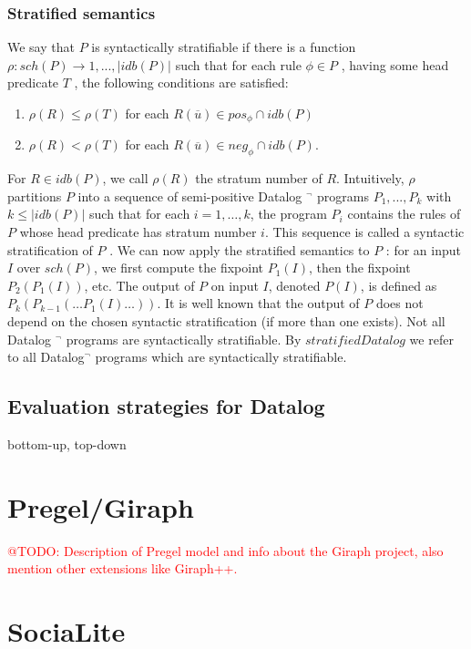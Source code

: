 \documentclass{pracamgr}
\makeatletter
\theoremstyle{plain}
\theoremstyle{definition}
\theoremstyle{remark}
\newcommand{\todo}[1]{\textcolor{red}{@TODO: #1}}
\makeatother
\begin{document}
\subsection{Stratified semantics} We say that $P$ is syntactically stratifiable if there is a function $\rho : sch(P ) \to {1, . . . , |idb(P )|}$
such that for each rule $\phi \in P$ , having some head predicate
$T$ , the following conditions are satisfied: 

\begin{enumerate}
\item $\rho(R) \le \rho(T )$ for each $R(\overline{u}) \in pos_\phi \cap idb(P)$
\item $\rho(R) < \rho(T )$ for each $R(\overline{u}) \in neg_\phi \cap idb(P )$.
\end{enumerate}
 For $R \in idb(P )$, we call $\rho(R)$ the stratum number of $R$. Intuitively, $\rho$ partitions $P$ into
a sequence of semi-positive Datalog $^\neg$ programs $P_1 , . . . , P_k$
with $k \le |idb(P )|$ such that for each $i = 1, \dots , k$, the program $P_i$ contains the rules of $P$ whose head predicate has
stratum number $i$. This sequence is called a syntactic stratification of $P$ . We can now apply the stratified semantics to
$P$ : for an input $I$ over $sch(P )$, we first compute the fixpoint
$P_1 (I)$, then the fixpoint $P_2 (P_1 (I))$, etc. The output of $P$ on
input $I$, denoted $P (I)$, is defined as $P_k (P_{k-1} (\dots P_1 (I) \dots))$.
It is well known that the output of $P$ does not depend on
the chosen syntactic stratification (if more than one exists).
Not all Datalog $^\neg$ programs are syntactically stratifiable. By
$stratified Datalog$ we refer to all Datalog$^\neg$ programs which
are syntactically stratifiable.

\section{Evaluation strategies for Datalog}
bottom-up, top-down

\chapter{Pregel/Giraph}\label{r:pregel}
\todo{Description of Pregel model and info about the Giraph project, also mention other extensions like Giraph++.}

\chapter{SociaLite}\label{r:socialite}
\end{document}
